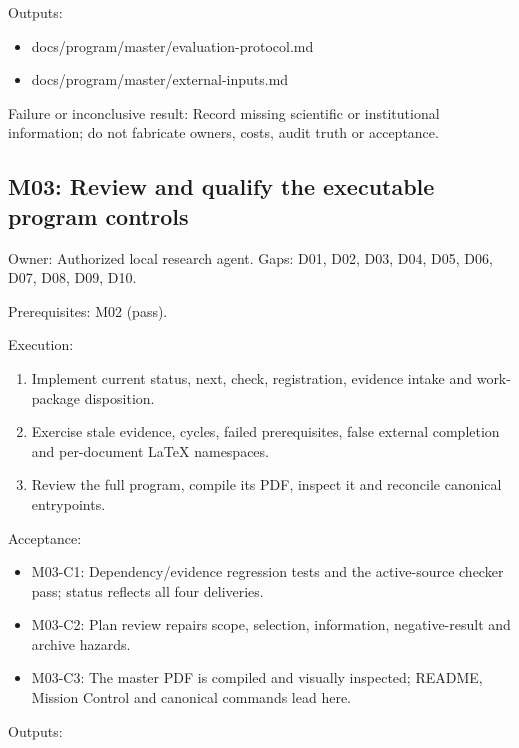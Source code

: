 \documentclass[
  11pt,
  a4paper,
]{article}
\providecommand{\tightlist}{%
  \setlength{\itemsep}{0pt}\setlength{\parskip}{0pt}}
\begin{document}
Outputs:

\begin{itemize}
\tightlist
\item
  docs/program/master/evaluation-protocol.md
\item
  docs/program/master/external-inputs.md
\end{itemize}

Failure or inconclusive result: Record missing scientific or
institutional information; do not fabricate owners, costs, audit truth
or acceptance.

\hypertarget{m03-review-and-qualify-the-executable-program-controls}{%
\subsection{M03: Review and qualify the executable program
controls}\label{m03-review-and-qualify-the-executable-program-controls}}

Owner: Authorized local research agent. Gaps: D01, D02, D03, D04, D05,
D06, D07, D08, D09, D10.

Prerequisites: M02 (pass).

Execution:

\begin{enumerate}
\def\labelenumi{\arabic{enumi}.}
\tightlist
\item
  Implement current status, next, check, registration, evidence intake
  and work-package disposition.
\item
  Exercise stale evidence, cycles, failed prerequisites, false external
  completion and per-document LaTeX namespaces.
\item
  Review the full program, compile its PDF, inspect it and reconcile
  canonical entrypoints.
\end{enumerate}

Acceptance:

\begin{itemize}
\tightlist
\item
  M03-C1: Dependency/evidence regression tests and the active-source
  checker pass; status reflects all four deliveries.
\item
  M03-C2: Plan review repairs scope, selection, information,
  negative-result and archive hazards.
\item
  M03-C3: The master PDF is compiled and visually inspected; README,
  Mission Control and canonical commands lead here.
\end{itemize}

Outputs:
\end{document}
